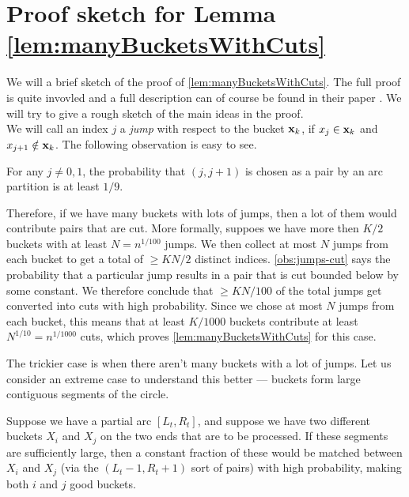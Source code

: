 \section{Proof sketch for Lemma \ref{lem:manyBucketsWithCuts}}

We will a brief sketch of the proof of \autoref{lem:manyBucketsWithCuts}.
The full proof is quite invovled and a full description can of course be found in their paper \cite{dmpy12}.
We will try to give a rough sketch of the main ideas in the proof. \\

We will call an index $j$ a \emph{jump} with respect to the bucket $\mathbf{x}_k$, if $x_j \in \mathbf{x}_k$ and $x_{j+1} \notin \mathbf{x}_k$.
The following observation is easy to see.

\begin{observation}\label{obs:jumps-cut}
  For any $j\neq 0,1$, the probability that $(j,j+1)$ is chosen as a pair by an arc partition is at least $1/9$. 
\end{observation}

Therefore, if we have many buckets with lots of jumps, then a lot of them would contribute pairs that are cut.
More formally, suppoes we have more then $K/2$ buckets with at least $N = n^{1/100}$ jumps.
We then collect at most $N$ jumps from each bucket to get a total of $\geq KN/2$ distinct indices.
\autoref{obs:jumps-cut} says the probability that a particular jump results in a pair that is cut bounded below by some constant.
We therefore conclude that $\geq KN/100$ of the total jumps get converted into cuts with high probability.
Since we chose at most $N$ jumps from each bucket, this means that at least $K/1000$ buckets contribute at least $N^{1/10} = n^{1/1000}$ cuts, which proves \autoref{lem:manyBucketsWithCuts} for this case.

\medskip

The trickier case is when there aren't many buckets with a lot of jumps.
Let us consider an extreme case to understand this better --- buckets form large contiguous segments of the circle.

Suppose we have a partial arc $[L_t,R_t]$, and suppose we have two different buckets $X_i$ and $X_j$ on the two ends that are to be processed.
If these segments are sufficiently large, then a constant fraction of these would be matched between $X_i$ and $X_j$ (via the $(L_t-1,R_t+1)$ sort of pairs) with high probability, making both $i$ and $j$ good buckets.

